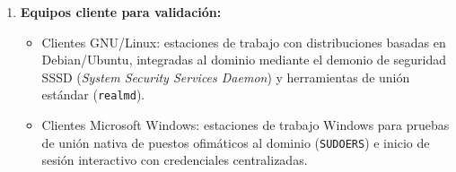\begin{enumerate}[label=\alph*)]
    \item \textbf{Equipos cliente para validación:}
    \begin{itemize}
        \item Clientes GNU/Linux: estaciones de trabajo con distribuciones basadas en Debian/Ubuntu, integradas al dominio mediante el demonio de seguridad SSSD (\textit{System Security Services Daemon}) y herramientas de unión estándar (\texttt{realmd}).
        \item Clientes Microsoft Windows: estaciones de trabajo Windows para pruebas de unión nativa de puestos ofimáticos al dominio (\texttt{SUDOERS}) e inicio de sesión interactivo con credenciales centralizadas.
    \end{itemize}
\end{enumerate}